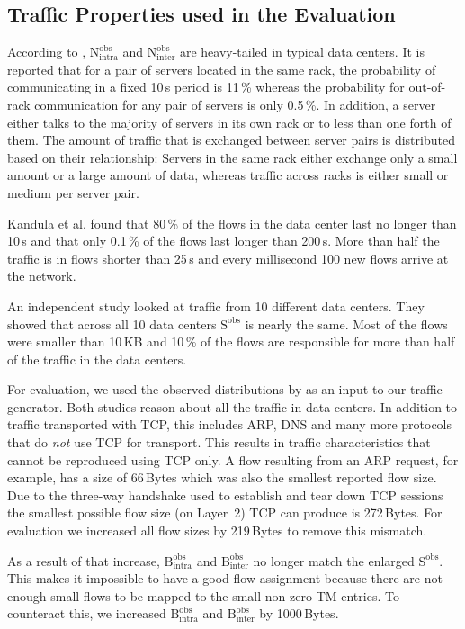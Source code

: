 \documentclass[journal,10pt]{IEEEtran}
\newcommand{\bytes}[2]{\ensuremath{\mathrm{B}^{\mathrm{#1}}_{\mathrm{#2}}}}
\newcommand{\partners}[2]{\ensuremath{\mathrm{N}^{\mathrm{#1}}_{\mathrm{#2}}}}
\newcommand{\size}[1]{\ensuremath{\mathrm{S}  ^{\mathrm{#1}}}}
\begin{document}
	

	\subsection{Traffic Properties used in the Evaluation}
According to \cite{MSR-datacenters}, \partners{obs}{intra} and \partners{obs}{inter} are heavy-tailed in typical data centers. 
It is reported that for a pair of
servers located in the same rack, the probability of communicating in a fixed 10\,s period is 11\,\% whereas the probability for out-of-rack 
communication for any pair of servers is only 0.5\,\%. 
In addition, a server either talks to the majority of servers in its own rack or to less than one forth of them.
The amount of traffic that is exchanged between server pairs is distributed based on their relationship: 
Servers in the same rack either exchange only a small amount or a large amount of data, 
whereas traffic across racks is either small or medium per server pair. 

Kandula et al. \cite{MSR-datacenters} found that 80\,\% of the flows in the data center last no longer than 10\,s and that only 0.1\,\% of the flows last longer than 200\,s.
More than half the traffic is in flows shorter than 25\,s and every millisecond 100 new flows arrive at the network.

An independent study \cite{datacentersInTheWild} looked at traffic from 10 different data centers. They
showed that across all 10 data centers \size{obs} is nearly the same. Most of the flows were smaller than 10\,KB and
10\,\% of the flows are responsible for more than half of the traffic in the data centers.

For evaluation, we used the observed distributions by \cite{MSR-datacenters, datacentersInTheWild} as an input to our traffic generator.
Both studies reason about all the traffic in data centers. In addition to traffic transported with TCP, this includes ARP, DNS and many more
protocols that do \emph{not} use TCP for transport.
This results in traffic characteristics that cannot be reproduced using TCP only. 
A flow resulting from an ARP request, for example, has a size of 66\,Bytes which was also the smallest reported flow size.
Due to the three-way handshake used to establish and tear down TCP sessions the smallest possible flow size (on Layer~2) TCP can produce is 272\,Bytes.
For evaluation we increased all flow sizes by 219\,Bytes to remove this mismatch.


As a result of that increase, 
\bytes{obs}{intra} and \bytes{obs}{inter} no longer match the enlarged \size{obs}.
This makes it impossible to have a good flow assignment because there are not enough small flows to be mapped to the small non-zero TM entries.
To counteract this, we increased \bytes{obs}{intra} and \bytes{obs}{inter} by 1000\,Bytes.
\end{document}
